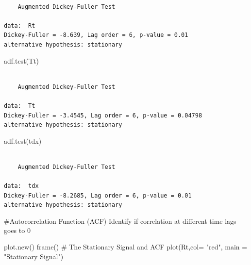 \documentclass[
  letterpaper,
  DIV=11,
  numbers=noendperiod]{scrartcl}
\newenvironment{Shaded}{\begin{snugshade}}{\end{snugshade}}
\newcommand{\AttributeTok}[1]{\textcolor[rgb]{0.40,0.45,0.13}{#1}}
\newcommand{\CommentTok}[1]{\textcolor[rgb]{0.37,0.37,0.37}{#1}}
\newcommand{\FunctionTok}[1]{\textcolor[rgb]{0.28,0.35,0.67}{#1}}
\newcommand{\NormalTok}[1]{\textcolor[rgb]{0.00,0.23,0.31}{#1}}
\newcommand{\StringTok}[1]{\textcolor[rgb]{0.13,0.47,0.30}{#1}}
\begin{document}
\begin{verbatim}

    Augmented Dickey-Fuller Test

data:  Rt
Dickey-Fuller = -8.639, Lag order = 6, p-value = 0.01
alternative hypothesis: stationary
\end{verbatim}

\begin{Shaded}
\begin{Highlighting}[]
\FunctionTok{adf.test}\NormalTok{(Tt)}
\end{Highlighting}
\end{Shaded}

\begin{verbatim}

    Augmented Dickey-Fuller Test

data:  Tt
Dickey-Fuller = -3.4545, Lag order = 6, p-value = 0.04798
alternative hypothesis: stationary
\end{verbatim}

\begin{Shaded}
\begin{Highlighting}[]
\FunctionTok{adf.test}\NormalTok{(tdx)}
\end{Highlighting}
\end{Shaded}

\begin{verbatim}

    Augmented Dickey-Fuller Test

data:  tdx
Dickey-Fuller = -8.2685, Lag order = 6, p-value = 0.01
alternative hypothesis: stationary
\end{verbatim}

\#Autocorrelation Function (ACF) Identify if correlation at different
time lags goes to 0

\begin{Shaded}
\begin{Highlighting}[]
\FunctionTok{plot.new}\NormalTok{()}
\FunctionTok{frame}\NormalTok{()}
\CommentTok{\# The Stationary Signal and ACF}
\FunctionTok{plot}\NormalTok{(Rt,}\AttributeTok{col=} \StringTok{"red"}\NormalTok{, }\AttributeTok{main =} \StringTok{"Stationary Signal"}\NormalTok{)}
\end{Highlighting}
\end{Shaded}
\end{document}
